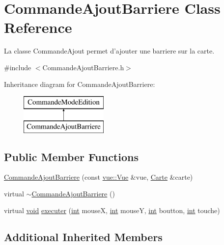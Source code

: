 \hypertarget{class_commande_ajout_barriere}{\section{Commande\-Ajout\-Barriere Class Reference}
\label{class_commande_ajout_barriere}
}


La classe Commande\-Ajout permet d'ajouter une barriere sur la carte.  




{\ttfamily \#include $<$Commande\-Ajout\-Barriere.\-h$>$}

Inheritance diagram for Commande\-Ajout\-Barriere\-:\begin{figure}[H]
\begin{center}
\leavevmode
\includegraphics[height=2.000000cm]{class_commande_ajout_barriere}
\end{center}
\end{figure}
\subsection*{Public Member Functions}
\begin{DoxyCompactItemize}
\item 
\hyperlink{class_commande_ajout_barriere_a97062e0aa94ec0c70d6e66050d835988}{Commande\-Ajout\-Barriere} (const \hyperlink{classvue_1_1_vue}{vue\-::\-Vue} \&vue, \hyperlink{class_carte}{Carte} \&carte)
\item 
virtual \hyperlink{class_commande_ajout_barriere_acd8fbb39e8062e5cc4959493c7ea3717}{$\sim$\-Commande\-Ajout\-Barriere} ()
\item 
virtual \hyperlink{wglew_8h_aeea6e3dfae3acf232096f57d2d57f084}{void} \hyperlink{class_commande_ajout_barriere_a23c6176e97b56fed95b2e02b37515290}{executer} (\hyperlink{wglew_8h_a500a82aecba06f4550f6849b8099ca21}{int} mouse\-X, \hyperlink{wglew_8h_a500a82aecba06f4550f6849b8099ca21}{int} mouse\-Y, \hyperlink{wglew_8h_a500a82aecba06f4550f6849b8099ca21}{int} boutton, \hyperlink{wglew_8h_a500a82aecba06f4550f6849b8099ca21}{int} touche)
\end{DoxyCompactItemize}
\subsection*{Additional Inherited Members}


